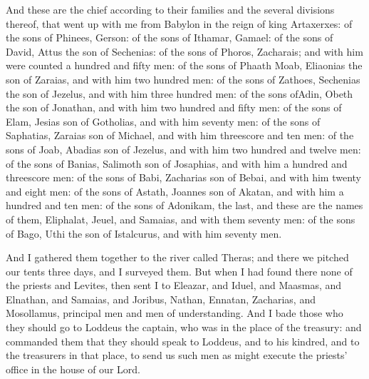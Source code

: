 {And these are the chief according to their families and the several divisions thereof, that went up with me from Babylon in the reign of king Artaxerxes:
of the sons of Phinees, Gerson: of the sons of Ithamar, Gamael: of the sons of David,
 Attus
 the son of Sechenias:
of the sons of Phoros, Zacharais; and with him were counted a hundred and fifty men:
of the sons of Phaath Moab, Eliaonias the son of
 Zaraias, and with him two hundred men:
 of the sons of Zathoes, Sechenias the son of Jezelus, and with him
 three hundred men: of the sons ofAdin, Obeth the son of Jonathan, and with him two hundred and fifty men:
of the sons of Elam, Jesias son of
{} Gotholias, and with him seventy men:
of the sons of Saphatias,
{} Zaraias son of Michael, and with him threescore and ten men:
of the sons of Joab,
{} Abadias son of
{} Jezelus, and with him two hundred and twelve men:
 of the sons of Banias, Salimoth son of Josaphias, and with him a hundred and threescore men:
of the sons of Babi, Zacharias son of Bebai, and with him twenty and eight men:
of the sons of
{} Astath, Joannes son of
{} Akatan, and with him a hundred and ten men:
of the sons of Adonikam, the last, and these are the names of them, Eliphalat, Jeuel, and
{} Samaias, and with them seventy men:
of the sons of
{} Bago, Uthi the son of Istalcurus, and with him seventy men.
\par }{\PP {}And I gathered them together to the river called Theras; and there we pitched our tents three days, and I surveyed them.
But when I had found there none of the priests and Levites,
then sent I to Eleazar, and
{} Iduel, and Maasmas,
and Elnathan, and Samaias, and
{} Joribus, Nathan, Ennatan, Zacharias, and Mosollamus, principal men and men of understanding.
And I bade those who they should go to
{} Loddeus the captain, who was in the place of
{} the treasury:
and commanded them that they should speak to Loddeus, and to his kindred, and to the treasurers in that place, to send us such men as might execute the priests’ office in the house of our Lord.
}
